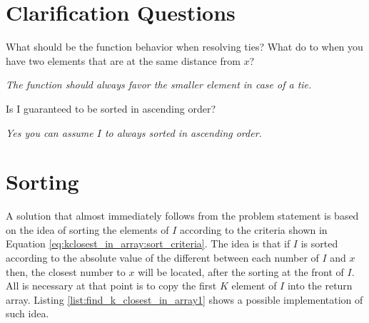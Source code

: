 \section{Clarification Questions}

\begin{QandA}
	\item \item \begin{questionitem} \begin{question} What should be the function behavior when resolving ties? What do to when you have two
	elements that are at the same distance from $x$? \end{question}
	\begin{answered}
		\textit{The function should always favor the smaller element in case of a tie.}
	\end{answered} \end{questionitem}
	
	\item \begin{questionitem} \begin{question} Is I guaranteed to be sorted in ascending order?  \end{question} 	 
    \begin{answered}
		\textit{Yes you can assume $I$ to  always sorted in ascending order.}
	\end{answered} \end{questionitem}
	
\end{QandA}

\section{Sorting}
\label{sec:find_k_closest_in_array:sorting}
A solution that almost immediately follows from the problem statement is based on the idea of
sorting the elements of $I$ according to the criteria shown in Equation
\ref{eq:kclosest_in_array:sort_criteria}. The idea is that if $I$ is sorted according to the
absolute value of the different between each number of $I$ and $x$ then, the closest number to $x$
will be located, after the sorting at the front of $I$. All is necessary at that point is to copy
the first $K$ element of $I$ into the return array. Listing \ref{list:find_k_closest_in_array1}
shows a possible implementation of such idea. 


